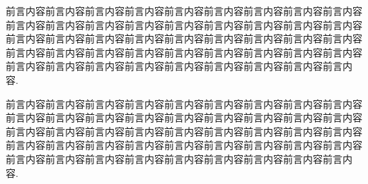 

\begin{preface}

前言内容前言内容前言内容前言内容前言内容前言内容前言内容前言内容前言内容前言内容前言内容前言内容前言内容前言内容前言内容前言内容前言内容前言内容前言内容前言内容前言内容前言内容前言内容前言内容前言内容前言内容前言内容前言内容前言内容前言内容前言内容前言内容前言内容前言内容前言内容前言内容前言内容前言内容前言内容前言内容前言内容前言内容前言内容前言内容前言内容.

前言内容前言内容前言内容前言内容前言内容前言内容前言内容前言内容前言内容前言内容前言内容前言内容前言内容前言内容前言内容前言内容前言内容前言内容前言内容前言内容前言内容前言内容前言内容前言内容前言内容前言内容前言内容前言内容前言内容前言内容前言内容前言内容前言内容前言内容前言内容前言内容前言内容前言内容前言内容前言内容前言内容前言内容前言内容前言内容前言内容.


\end{preface} 